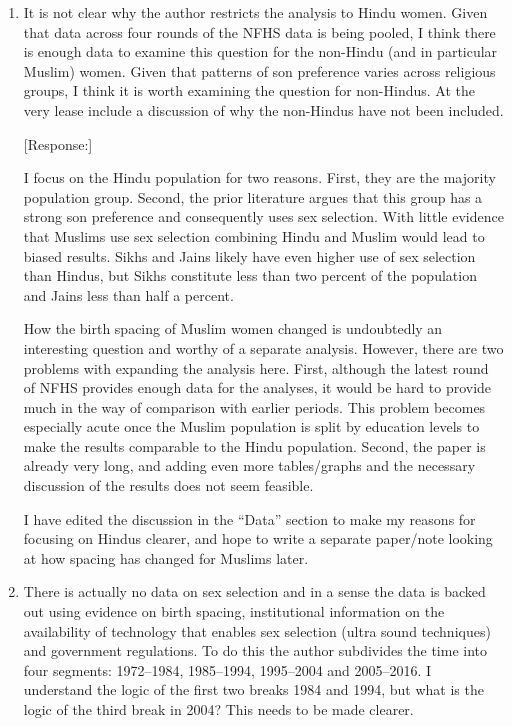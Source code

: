 \documentclass[letterpaper,12pt]{article}
\begin{document}
\begin{enumerate}

\item It is not clear why the author restricts the analysis to Hindu
women. Given that data across four rounds of the NFHS data is being
pooled, I think there is enough data to examine this question for the
non-Hindu (and in particular Muslim) women. Given that patterns of son
preference varies across religious groups, I think it is worth examining
the question for non-Hindus. At the very lease include a discussion of
why the non-Hindus have not been included.

[Response:]

I focus on the Hindu population for two reasons. 
First, they are the majority population group. 
Second, the prior literature argues that this group has a strong son preference and 
consequently uses sex selection. 
With little evidence that Muslims use sex selection combining Hindu and Muslim 
would lead to biased results.
Sikhs and Jains likely have even higher use of sex selection than Hindus, but Sikhs 
constitute less than two percent of the population and Jains less than half a percent. 

How the birth spacing of Muslim women changed is undoubtedly an interesting question and 
worthy of a separate analysis. 
However, there are two problems with expanding the analysis here. 
First, although the latest round of NFHS provides enough data for the analyses, it would 
be hard to provide much in the way of comparison with earlier periods. 
This problem becomes especially acute once the Muslim population is split by education 
levels to make the results comparable to the Hindu population. 
Second, the paper is already very long, and adding even more tables/graphs and the 
necessary discussion of the results does not seem feasible.

I have edited the discussion in the ``Data'' section to make my reasons for focusing
on Hindus clearer, and hope to write a separate paper/note looking at how spacing
has changed for Muslims later.





\item There is actually no data on sex selection and in a sense the data
is backed out using evidence on birth spacing, institutional information
on the availability of technology that enables sex selection (ultra
sound techniques) and government regulations. To do this the author
subdivides the time into four segments: 1972--1984, 1985--1994, 1995--2004
and 2005--2016. I understand the logic of the first two breaks 1984 and
1994, but what is the logic of the third break in 2004? This needs to be
made clearer.


\end{enumerate}
\end{document}
